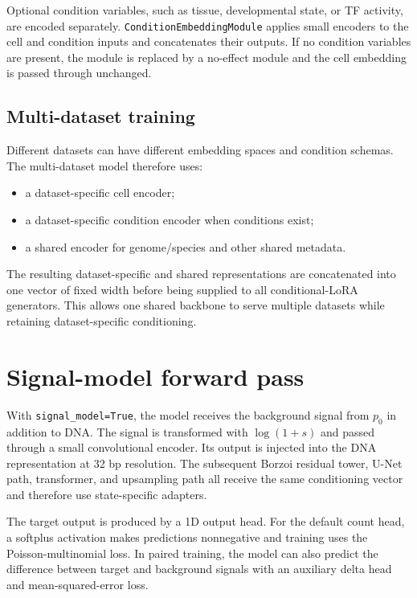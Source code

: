 \documentclass[11pt]{article}
\newcommand{\code}[1]{\texttt{\small #1}}
\begin{document}
Optional condition variables, such as tissue, developmental state, or TF activity, are
encoded separately. \code{ConditionEmbeddingModule} applies small encoders to the cell and
condition inputs and concatenates their outputs. If no condition variables are present, the
module is replaced by a no-effect module and the cell embedding is passed through unchanged.

\subsection{Multi-dataset training}

Different datasets can have different embedding spaces and condition schemas. The
multi-dataset model therefore uses:

\begin{itemize}[leftmargin=2em]
  \item a dataset-specific cell encoder;
  \item a dataset-specific condition encoder when conditions exist;
  \item a shared encoder for genome/species and other shared metadata.
\end{itemize}

The resulting dataset-specific and shared representations are concatenated into one vector
of fixed width before being supplied to all conditional-LoRA generators. This allows one
shared backbone to serve multiple datasets while retaining dataset-specific conditioning.

\section{Signal-model forward pass}

With \code{signal\_model=True}, the model receives the background signal from $p_0$ in
addition to DNA. The signal is transformed with $\log(1+s)$ and passed through a small
convolutional encoder. Its output is injected into the DNA representation at 32 bp
resolution. The subsequent Borzoi residual tower, U-Net path, transformer, and upsampling
path all receive the same conditioning vector and therefore use state-specific adapters.

The target output is produced by a 1D output head. For the default count head, a softplus
activation makes predictions nonnegative and training uses the Poisson-multinomial loss.
In paired training, the model can also predict the difference between target and background
signals with an auxiliary delta head and mean-squared-error loss.
\end{document}
